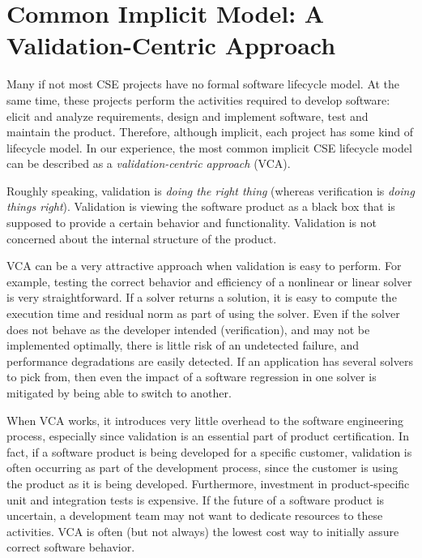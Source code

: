 \documentclass[11pt]{SANDreport}
\begin{document}
%
{}\section {Common Implicit Model: A Validation-Centric Approach}
\label{sec:validation_centric_approach}

Many if not most CSE projects have no formal software lifecycle model.
At the same time, these projects perform the activities required to
develop software: elicit and analyze requirements, design and
implement software, test and maintain the product.  Therefore,
although implicit, each project has some kind of lifecycle model.  In
our experience, the most common implicit CSE lifecycle model can be
described as a \textit{validation-centric approach} (VCA).

Roughly speaking, validation is \textit{doing the right thing}
(whereas verification is \textit{doing things right}).  Validation is
viewing the software product as a black box that is supposed to
provide a certain behavior and functionality.  Validation is not
concerned about the internal structure of the product.

VCA can be a very attractive approach when validation is easy to
perform.  For example, testing the correct behavior and efficiency of
a nonlinear or linear solver is very straightforward.  If a solver
returns a solution, it is easy to compute the execution time and
residual norm as part of using the solver.  Even if the solver does
not behave as the developer intended (verification), and may not be
implemented optimally, there is little risk of an undetected failure,
and performance degradations are easily detected.  If an application
has several solvers to pick from, then even the impact of a software
regression in one solver is mitigated by being able to switch to
another.

When VCA works, it introduces very little overhead to the software
engineering process, especially since validation is an essential part
of product certification.  In fact, if a software product is being
developed for a specific customer, validation is often occurring as
part of the development process, since the customer is using the
product as it is being developed.  Furthermore, investment in
product-specific unit and integration tests is expensive.  If the
future of a software product is uncertain, a development team may not
want to dedicate resources to these activities.  VCA is often (but not
always) the lowest cost way to initially assure correct software
behavior.
\end{document}
